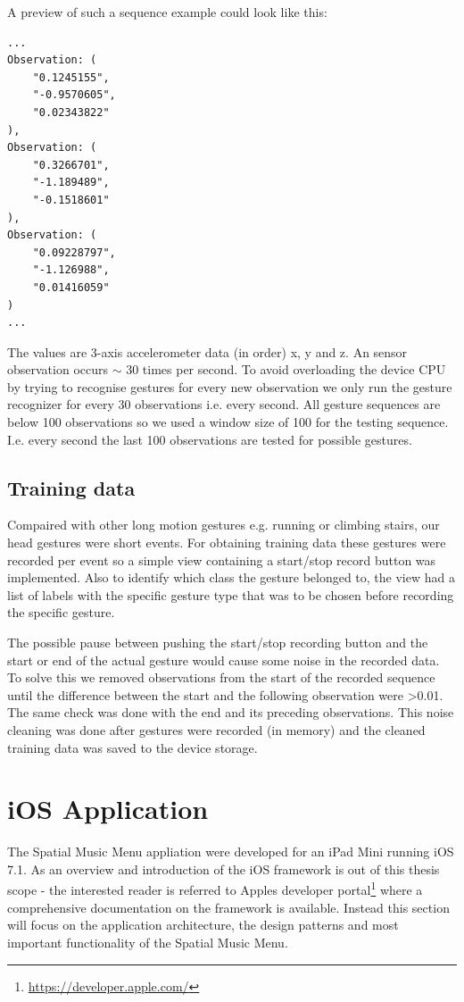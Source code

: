 A preview of such a sequence example could look like this:

\begin{lstlisting}
...
Observation: (
    "0.1245155",
    "-0.9570605",
    "0.02343822"
),
Observation: (
    "0.3266701",
    "-1.189489",
    "-0.1518601"
),
Observation: (
    "0.09228797",
    "-1.126988",
    "0.01416059"
)
...
\end{lstlisting}

The values are 3-axis accelerometer data (in order) x, y and z. An sensor observation occurs $\sim$ 30 times per second. To avoid overloading the device CPU by trying to recognise gestures for every new observation we only run the gesture recognizer for every 30 observations i.e. every second. All gesture sequences are below 100 observations so we used a window size of 100 for the testing sequence. I.e. every second the last 100 observations are tested for possible gestures.

\subsection{Training data}
Compaired with other long motion gestures e.g. running or climbing stairs, our head gestures were short events. For obtaining training data these gestures were recorded per event so a simple view containing a start/stop record button was implemented. Also to identify which class the gesture belonged to, the view had a list of labels with the specific gesture type that was to be chosen before recording the specific gesture.

The possible pause between pushing the start/stop recording button and the start or end of the actual gesture would cause some noise in the recorded data. To solve this we removed observations from the start of the recorded sequence until the difference between the start and the following observation were \textgreater 0.01. The same check was done with the end and its preceding observations. This noise cleaning was done after gestures were recorded (in memory) and the cleaned training data was saved to the device storage.


\section{iOS Application}
The Spatial Music Menu appliation were developed for an iPad Mini running iOS 7.1. As an overview and introduction of the iOS framework is out of this thesis scope - the interested reader is referred to Apples developer portal\footnote{\url{https://developer.apple.com/}} where a comprehensive documentation on the framework is available. Instead this section will focus on the application architecture, the design patterns and most important functionality of the Spatial Music Menu.

